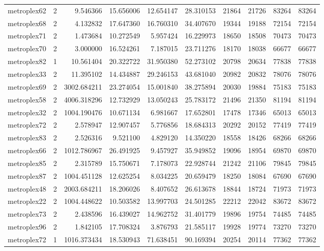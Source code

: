 \begin{longtable}{|l|r|r|r|r|r|r|r|r|r|}
metroplex62 & 2 & 9.546366 & 15.656006 & 12.654147 & 28.310153 & 21864 & 21726 & 83264 & 83264 \\
metroplex68 & 2 & 4.132832 & 17.647360 & 16.760310 & 34.407670 & 19344 & 19188 & 72154 & 72154 \\
metroplex71 & 2 & 1.473684 & 10.272549 & 5.957424 & 16.229973 & 18650 & 18508 & 70473 & 70473 \\
metroplex70 & 2 & 3.000000 & 16.524261 & 7.187015 & 23.711276 & 18170 & 18038 & 66677 & 66677 \\
metroplex82 & 1 & 10.561404 & 20.322722 & 31.950380 & 52.273102 & 20798 & 20634 & 77838 & 77838 \\
metroplex33 & 2 & 11.395102 & 14.434887 & 29.246153 & 43.681040 & 20982 & 20832 & 78076 & 78076 \\
metroplex69 & 2 & 3002.684211 & 23.274054 & 15.001840 & 38.275894 & 20030 & 19884 & 75183 & 75183 \\
metroplex58 & 2 & 4006.318296 & 12.732929 & 13.050243 & 25.783172 & 21496 & 21350 & 81194 & 81194 \\
metroplex32 & 2 & 1004.190476 & 10.671134 & 6.981667 & 17.652801 & 17478 & 17346 & 65013 & 65013 \\
metroplex72 & 2 & 2.578947 & 12.907457 & 5.776856 & 18.684313 & 20292 & 20152 & 77419 & 77419 \\
metroplex83 & 2 & 2.526316 & 9.521100 & 4.829120 & 14.350220 & 18558 & 18426 & 68266 & 68266 \\
metroplex66 & 2 & 1012.786967 & 26.491925 & 9.457927 & 35.949852 & 19096 & 18954 & 69870 & 69870 \\
metroplex85 & 2 & 2.315789 & 15.750671 & 7.178073 & 22.928744 & 21242 & 21106 & 79845 & 79845 \\
metroplex87 & 2 & 1004.451128 & 12.625254 & 8.034225 & 20.659479 & 18250 & 18084 & 67690 & 67690 \\
metroplex48 & 2 & 2003.684211 & 18.206026 & 8.407652 & 26.613678 & 18844 & 18724 & 71973 & 71973 \\
metroplex22 & 2 & 1004.448622 & 10.503582 & 13.997703 & 24.501285 & 22212 & 22042 & 83672 & 83672 \\
metroplex73 & 2 & 2.438596 & 16.439027 & 14.962752 & 31.401779 & 19896 & 19754 & 74485 & 74485 \\
metroplex96 & 2 & 1.842105 & 17.708324 & 3.876793 & 21.585117 & 19928 & 19774 & 73270 & 73270 \\
metroplex72 & 1 & 1016.373434 & 18.530943 & 71.638451 & 90.169394 & 20254 & 20114 & 77362 & 77362 \\

\end{longtable}
